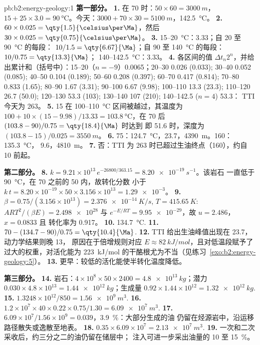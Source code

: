 \begin{solution}{pb:b2:energy-geology:1}
\noindent\textbf{第一部分。}
\textbf{1.} 在 \qty{70}{\Ma} 时：$50 \times 60 = \qty{3000}{m}$，$15 + 25 \times 3.0 =
\qty{90}{\celsius}$。今天：$3000 + 70 \times 30 = \qty{5100}{m}$，\qty{142.5}{\celsius}。
\textbf{2.} $60 \times 0.025 = \qty{1.5}{\celsius\per\Ma}$，然后 $30 \times 0.025 =
\qty{0.75}{\celsius\per\Ma}$。
\textbf{3.} 15--\qty{20}{\celsius}：\qty{3.33}{\Ma}；自 20 至 \qty{90}{\celsius} 的每段：
$10/1.5 = \qty{6.67}{\Ma}$；自 90 至 \qty{140}{\celsius} 的每段：$10/0.75 = \qty{13.3}{\Ma}$；
140--\qty{142.5}{\celsius}：\qty{3.33}{\Ma}。
\textbf{4.} 各区间的值 $\Delta t_n 2^n$，并给出累计和（括号中）：15--20（$n = -9$）0.0065；20--30
0.026 (0.033); 30--40 0.052 (0.085); 40--50 0.104 (0.189); 50--60 0.208 (0.397); 60--70 0.417
(0.814); 70--80 0.833 (1.65); 80--90 1.67 (3.31); 90--100 6.67 (9.98); 100--110 13.3 (23.3);
110--120 26.7 (50.0); 120--130 53.3 (103); 130--140 107 (210); 140--142.5 ($n = 4$) 53.3：
TTI 今天为 263。
\textbf{5.} 15 在 100--\qty{110}{\celsius} 区间被越过，其温度为 $100 + 10 \times
(15 - 9.98)/13.33 = \qty{103.8}{\celsius}$，在 \qty{70}{\Ma} 后 $(103.8 - 90)/0.75 = \qty{18.4}{\Ma}$ 时达到
即 \qty{51.6}{\Ma} 时，深度为 $(103.8 - 15)/0.025 = \qty{3550}{m}$。
\textbf{6.} 75：\qty{124.7}{\celsius}，\qty{23.7}{\Ma}，\qty{4390}{m}。160：\qty{135.3}{\celsius}，
\qty{9.6}{\Ma}，\qty{4810}{m}。
\textbf{7.} 否：TTI 为 263 时已超过生油终点（160），约自 \qty{10}{\Ma} 前起。

\noindent\textbf{第二部分。}
\textbf{8.} $k = 9.21 \times 10^{13}\,e^{-26800/363.15} = \qty{8.20e-19}{s^{-1}}$。该岩石
一直低于 \qty{90}{\celsius}，在 \qty{70}{\Ma} 之前的 \qty{50}{\Ma} 内，故转化分数
小于 $k\,t = 8.20 \times 10^{-19} \times 50 \times 3.156 \times 10^{13} = \num{1.29e-3}$。
\textbf{9.} $\beta = 0.75/(3.156 \times 10^{13}) = \qty{2.376e-14}{K/s}$, $T = \qty{415.65}{K}$:
$ART^2/(\beta E) = \num{2.498e28}$ 与 $e^{-E/RT} = \num{9.95e-29}$，故 $u = 2.486$，$x = 0.0833$ 且
转化率为 0.917。
\textbf{10.} \qty{134.7}{\celsius}.
\textbf{11.} $70 - (134.7 - 90)/0.75 = \qty{10.4}{\Ma}$.
\textbf{12.} TTI 给出生油峰值出现在 \qty{23.7}{\Ma}，动力学结果则晚 \qty{13}{\Ma}，
原因在于倍增规则对应 $E \approx \qty{82}{kJ/mol}$，且对低温段赋予了
过大的权重，对活化能为 \qty{223}{kJ/mol} 的干酪根尤为不当（见练习~\ref{exo:b2:energy-geology:5}）。
\textbf{13.} 更早：较低的活化能使半转化温度降低。

\noindent\textbf{第三部分。}
\textbf{14.} 岩石：$4 \times 10^8 \times 50 \times 2400 = \qty{4.8e13}{kg}$；潜力 $0.030
\times 4.8 \times 10^{13} = \qty{1.44e12}{kg}$；生成量 $0.92 \times 1.44 \times 10^{12} =
\qty{1.32e12}{kg}$.
\textbf{15.} $1.3248 \times 10^{12}/850 = \qty{1.56e9}{m^3}$.
\textbf{16.} $1.2 \times 10^7 \times 40 \times 0.22 \times 0.75/1.30 = \qty{6.09e7}{m^3}$.
\textbf{17.} $6.09 \times 10^7/1.56 \times 10^9 = 0.039$，\qty{3.9}{\percent}：大部分生成的油
仍留在烃源岩中，沿运移路径散失或逸散至地表。
\textbf{18.} $0.35 \times 6.09 \times 10^7 = \qty{2.13e7}{m^3}$.
\textbf{19.} 一次和二次采收后，约三分之二的油仍留在储层中；
 注入可进一步采出油量的 10 至 \qty{15}{\percent}。


\end{solution}
